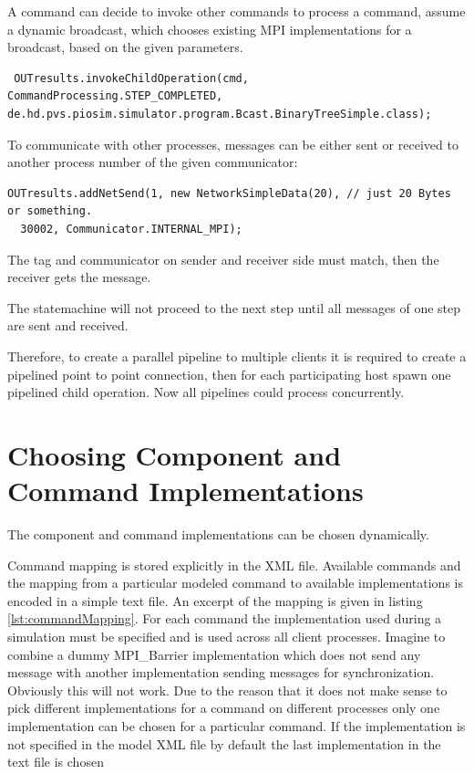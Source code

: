 \documentclass[
     11pt,         %
     a4paper,      %
     BCOR10mm,     %
     DIV14,        %
     liststotoc,   %
     bibtotoc,     %
     idxtotoc,     %
     parskip       %
     ]{scrreprt}   %
\begin{document}
A command can decide to invoke other commands to process a command,
assume a dynamic broadcast, which chooses existing MPI implementations for a broadcast, based on the given parameters.
\begin{verbatim}
 OUTresults.invokeChildOperation(cmd, CommandProcessing.STEP_COMPLETED, de.hd.pvs.piosim.simulator.program.Bcast.BinaryTreeSimple.class);
\end{verbatim}

To communicate with other processes, messages can be either sent or received to another process number of the
given communicator:
\begin{verbatim}
OUTresults.addNetSend(1, new NetworkSimpleData(20), // just 20 Bytes or something.
  30002, Communicator.INTERNAL_MPI);
\end{verbatim}
The tag and communicator on sender and receiver side must match, then the receiver gets the message.

The statemachine will not proceed to the next step until all messages of one step are sent and received.

Therefore, to create a parallel pipeline to multiple clients it is required to create a pipelined point to point connection,
then for each participating host spawn one pipelined child operation. 
Now all pipelines could process concurrently.

\section{Choosing Component and Command Implementations}
The component and command implementations can be chosen dynamically.

Command mapping is stored explicitly in the XML file.
Available commands and the mapping from a particular modeled command to available
implementations is encoded in a simple text file.
An excerpt of the mapping is given in listing \ref{lst:commandMapping}.
For each command the implementation used during a simulation must be specified and is used across
all client processes. Imagine to combine a dummy MPI\_Barrier implementation which
does not send any message with another implementation sending messages for synchronization.
Obviously this will not work. Due to the reason that it does not make sense to pick different
implementations for a command on different processes only one implementation can be chosen for
a particular command.
If the implementation is not specified in the model XML file by default the last implementation 
in the text file is chosen
\end{document}
